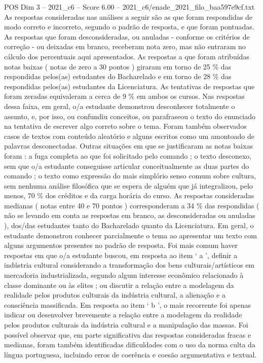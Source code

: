 \begin{textsample}{POS Dim 3 – 2021\_c6 – Score 6.00 – 2021\_c6/enade\_2021\_filo\_baa597e9cf.txt}
As respostas consideradas nas análises a seguir são as que foram respondidas de modo correto e incorreto, segundo o padrão de resposta, e que foram pontuadas.
As respostas que foram desconsideradas, ou anuladas - conforme os critérios de correção - ou deixadas em branco, receberam nota zero, mas não entraram no cálculo dos percentuais aqui apresentados.
As respostas a que foram atribuídas notas baixas ( notas de zero a 30 pontos ) giraram em torno de 25 \% das respondidas pelos(as) estudantes do Bacharelado e em torno de 28 \% das respondidas pelos(as) estudantes da Licenciatura.
As tentativas de respostas que foram zeradas equivaleram a cerca de 9 \% em ambos os cursos.
Nas respostas dessa faixa, em geral, o/a estudante demonstrou desconhecer totalmente o assunto, e, por isso, ou confundiu conceitos, ou parafraseou o texto do enunciado na tentativa de escrever algo correto sobre o tema.
Foram também observados casos de textos com conteúdo aleatório e alguns escritos como um amontoado de palavras desconectadas.
Outras situações em que se justificaram as notas baixas foram : a fuga completa ao que foi solicitado pelo comando ; o texto desconexo, sem que o/a estudante conseguisse articular conceitualmente as duas partes do comando ; o texto como expressão do mais simplório senso comum sobre cultura, sem nenhuma análise filosófica que se espera de alguém que já integralizou, pelo menos, 70 \% dos créditos e da carga horária do curso.
As respostas consideradas medianas ( notas entre 40 e 70 pontos ) corresponderam a 34 \% das respondidas ( não se levando em conta as respostas em branco, as desconsideradas ou anuladas ), dos/das estudantes tanto do Bacharelado quanto da Licenciatura.
Em geral, o estudante demonstrou conhecer parcialmente o tema ao apresentar um texto com alguns argumentos presentes no padrão de resposta.
Foi mais comum haver respostas em que o/a estudante buscou, em resposta ao item ‘ a ’, definir a indústria cultural considerando a transformação dos bens culturais/artísticos em mercadoria industrializada, segundo algum interesse econômico relacionado à classe dominante ou às elites ; ou discutir a relação entre a modelagem da realidade pelos produtos culturais da indústria cultural, a alienação e a consciência massificada.
Em resposta ao item ‘ b ’, o mais recorrente foi apenas indicar ou desenvolver brevemente a relação entre a modelagem da realidade pelos produtos culturais da indústria cultural e a manipulação das massas.
Foi possível observar que, em parte significativa das respostas consideradas fracas e medianas, foram também identificadas dificuldades com o uso da norma culta da língua portuguesa, incluindo erros de coerência e coesão argumentativa e textual.

\end{textsample}
